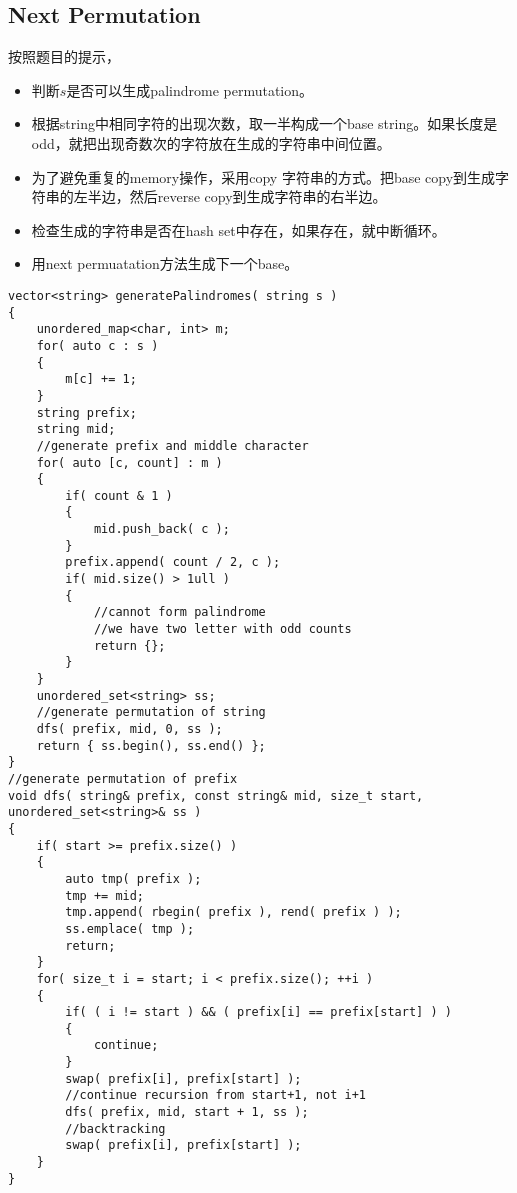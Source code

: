 \subsection{Next Permutation}
按照题目的提示，
\begin{itemize}
\item 判断$s$是否可以生成palindrome permutation。
\item 根据string中相同字符的出现次数，取一半构成一个base string。如果长度是odd，就把出现奇数次的字符放在生成的字符串中间位置。
\item 为了避免重复的memory操作，采用copy 字符串的方式。把base copy到生成字符串的左半边，然后reverse copy到生成字符串的右半边。
\item 检查生成的字符串是否在hash set中存在，如果存在，就中断循环。
\item 用next permuatation方法生成下一个base。
\end{itemize}
\setcounter{lstlisting}{0}
\begin{lstlisting}[style=customc, caption={Next Permutation}]
vector<string> generatePalindromes( string s )
{
    unordered_map<char, int> m;
    for( auto c : s )
    {
        m[c] += 1;
    }
    string prefix;
    string mid;
    //generate prefix and middle character
    for( auto [c, count] : m )
    {
        if( count & 1 )
        {
            mid.push_back( c );
        }
        prefix.append( count / 2, c );
        if( mid.size() > 1ull )
        {
            //cannot form palindrome
            //we have two letter with odd counts
            return {};
        }
    }
    unordered_set<string> ss;
    //generate permutation of string
    dfs( prefix, mid, 0, ss );
    return { ss.begin(), ss.end() };
}
//generate permutation of prefix
void dfs( string& prefix, const string& mid, size_t start, unordered_set<string>& ss )
{
    if( start >= prefix.size() )
    {
        auto tmp( prefix );
        tmp += mid;
        tmp.append( rbegin( prefix ), rend( prefix ) );
        ss.emplace( tmp );
        return;
    }
    for( size_t i = start; i < prefix.size(); ++i )
    {
        if( ( i != start ) && ( prefix[i] == prefix[start] ) )
        {
            continue;
        }
        swap( prefix[i], prefix[start] );
        //continue recursion from start+1, not i+1
        dfs( prefix, mid, start + 1, ss );
        //backtracking
        swap( prefix[i], prefix[start] );
    }
}
\end{lstlisting}